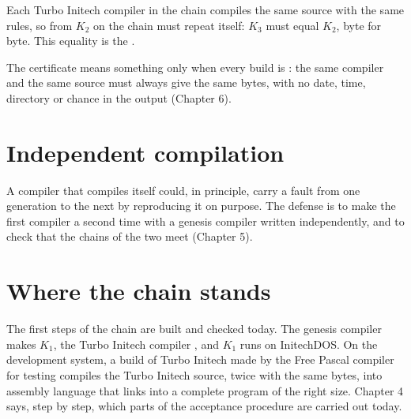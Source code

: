 Each Turbo Initech compiler in the chain compiles the same source with the
same rules, so from $K_2$ on the chain must repeat itself: $K_3$ must equal
$K_2$, byte for byte.  This equality is the .


The certificate means something only when every build is
: the same compiler and the same source must always
give the same bytes, with no date, time, directory or chance in the output
(Chapter 6).

\section{Independent compilation}
A compiler that compiles itself could, in principle, carry a fault from
one generation to the next by reproducing it on purpose.  The defense is
to make the first compiler a second time with a genesis compiler written
independently, and to check that the chains of the two meet (Chapter 5).

\section{Where the chain stands}
The first steps of the chain are built and checked today.  The genesis
compiler makes $K_1$, the Turbo Initech compiler , and $K_1$
runs on InitechDOS.  On the development system, a build of Turbo Initech
made by the Free Pascal compiler for testing compiles the Turbo Initech
source, twice with the same bytes, into assembly language that links into a
complete program of the right size.
Chapter 4 says, step by step, which parts of the acceptance procedure are
carried out today.
